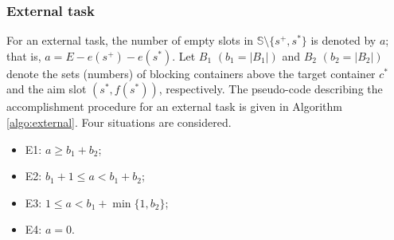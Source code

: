 \documentclass[review,3p,times,12pt,number]{elsarticle}\usepackage{amsmath}\usepackage{amssymb}
\begin{document}
\subsubsection{External task}
\label{sec:external}
For an external task, the number of empty slots in $\mathbb{S}\setminus\{s^+,s^*\}$ is denoted by $a$; that is, $a=E-e(s^+)-e(s^*)$. Let $B_1$ $(b_1=|B_1|)$ and $B_2$ $(b_2=|B_2|)$ denote the sets (numbers) of blocking containers above the target container $c^*$ and the aim slot $(s^*,f(s^*))$, respectively. The pseudo-code describing the accomplishment procedure for an external task is given in Algorithm \ref{algo:external}. Four situations are considered.
\begin{itemize}
\item E1: $a\ge b_1+b_2$;
\item E2: $b_1+1\le a<b_1+b_2$;
\item E3: $1\le a<b_1+\min\{1,b_2\}$;
\item E4: $a=0$.
\end{itemize}
\end{document}
